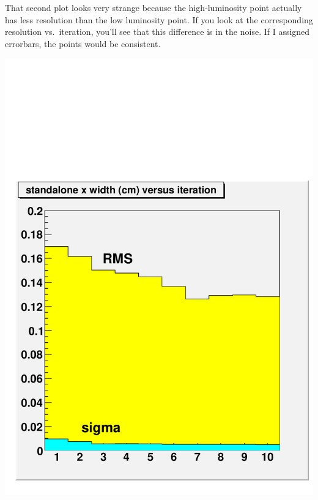 \documentclass[compress]{beamer}
\begin{document}
\begin{notes}
\item That second plot looks very strange because the high-luminosity
point actually has less resolution than the low luminosity point.  If
you look at the corresponding resolution vs.\ iteration, you'll see
that this difference is in the noise.  If I assigned errorbars, the
points would be consistent.

\includegraphics[width=0.5\linewidth]{realplots/x_width_vsiter_standalone_100}
\end{notes}






\end{document}
